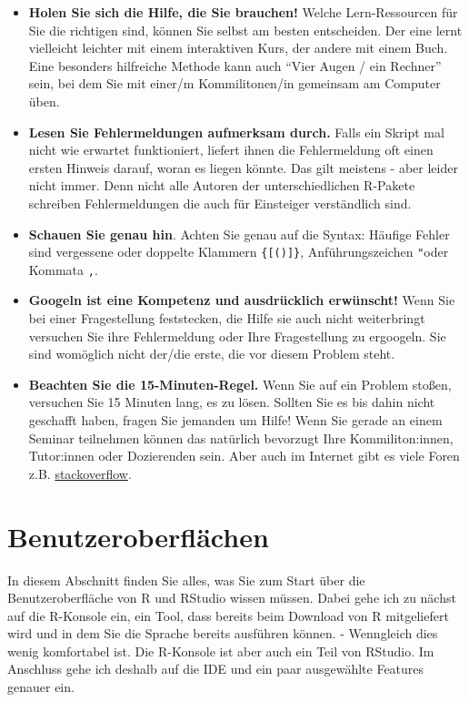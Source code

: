 \documentclass[
]{book}
\begin{document}
\begin{itemize}
\item
  \textbf{Holen Sie sich die Hilfe, die Sie brauchen!}
  Welche Lern-Ressourcen für Sie die richtigen sind, können Sie selbst am besten entscheiden. Der eine lernt vielleicht leichter mit einem interaktiven Kurs, der andere mit einem Buch. Eine besonders hilfreiche Methode kann auch ``Vier Augen / ein Rechner'' sein, bei dem Sie mit einer/m Kommilitonen/in gemeinsam am Computer üben.
\item
  \textbf{Lesen Sie Fehlermeldungen aufmerksam durch.}
  Falls ein Skript mal nicht wie erwartet funktioniert, liefert ihnen die Fehlermeldung oft einen ersten Hinweis darauf, woran es liegen könnte. Das gilt meistens - aber leider nicht immer. Denn nicht alle Autoren der unterschiedlichen R-Pakete schreiben Fehlermeldungen die auch für Einsteiger verständlich sind.
\item
  \textbf{Schauen Sie genau hin}.
  Achten Sie genau auf die Syntax: Häufige Fehler sind vergessene oder doppelte Klammern \texttt{\{{[}(){]}\}}, Anführungszeichen \texttt{"}oder Kommata \texttt{,}.
\item
  \textbf{Googeln ist eine Kompetenz und ausdrücklich erwünscht!}
  Wenn Sie bei einer Fragestellung feststecken, die Hilfe sie auch nicht weiterbringt versuchen Sie ihre Fehlermeldung oder Ihre Fragestellung zu ergoogeln. Sie sind womöglich nicht der/die erste, die vor diesem Problem steht.
\item
  \textbf{Beachten Sie die 15-Minuten-Regel.}
  Wenn Sie auf ein Problem stoßen, versuchen Sie 15 Minuten lang, es zu lösen. Sollten Sie es bis dahin nicht geschafft haben, fragen Sie jemanden um Hilfe! Wenn Sie gerade an einem Seminar teilnehmen können das natürlich bevorzugt Ihre Kommiliton:innen, Tutor:innen oder Dozierenden sein. Aber auch im Internet gibt es viele Foren z.B. \href{https://stackoverflow.com/}{stackoverflow}.
\end{itemize}

\hypertarget{benutzeroberfluxe4chen}{%
\chapter{Benutzeroberflächen}\label{benutzeroberfluxe4chen}}

In diesem Abschnitt finden Sie alles, was Sie zum Start über die Benutzeroberfläche von R und RStudio wissen müssen. Dabei gehe ich zu nächst auf die R-Konsole ein, ein Tool, dass bereits beim Download von R mitgeliefert wird und in dem Sie die Sprache bereits ausführen können. - Wenngleich dies wenig komfortabel ist. Die R-Konsole ist aber auch ein Teil von RStudio. Im Anschluss gehe ich deshalb auf die IDE und ein paar ausgewählte Features genauer ein.
\end{document}
